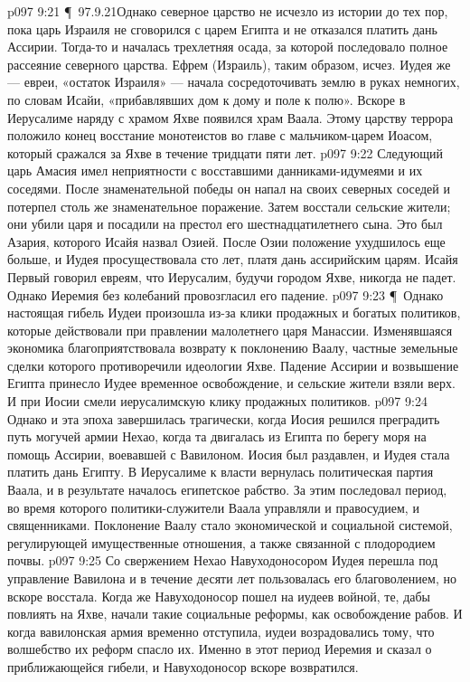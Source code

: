 \vs p097 9:21 \P\ 97.9.21Однако северное царство не исчезло из истории до тех пор, пока царь Израиля не сговорился с царем Египта и не отказался платить дань Ассирии. Тогда\hyp{}то и началась трехлетняя осада, за которой последовало полное рассеяние северного царства. Ефрем (Израиль), таким образом, исчез. Иудея же --- евреи, «остаток Израиля» --- начала сосредоточивать землю в руках немногих, по словам Исайи, «прибавлявших дом к дому и поле к полю». Вскоре в Иерусалиме наряду с храмом Яхве появился храм Ваала. Этому царству террора положило конец восстание монотеистов во главе с мальчиком\hyp{}царем Иоасом, который сражался за Яхве в течение тридцати пяти лет.
\vs p097 9:22 Следующий царь Амасия имел неприятности с восставшими данниками\hyp{}идумеями и их соседями. После знаменательной победы он напал на своих северных соседей и потерпел столь же знаменательное поражение. Затем восстали сельские жители; они убили царя и посадили на престол его шестнадцатилетнего сына. Это был Азария, которого Исайя назвал Озией. После Озии положение ухудшилось еще больше, и Иудея просуществовала сто лет, платя дань ассирийским царям. Исайя Первый говорил евреям, что Иерусалим, будучи городом Яхве, никогда не падет. Однако Иеремия без колебаний провозгласил его падение.
\vs p097 9:23 \P\ Однако настоящая гибель Иудеи произошла из\hyp{}за клики продажных и богатых политиков, которые действовали при правлении малолетнего царя Манассии. Изменявшаяся экономика благоприятствовала возврату к поклонению Ваалу, частные земельные сделки которого противоречили идеологии Яхве. Падение Ассирии и возвышение Египта принесло Иудее временное освобождение, и сельские жители взяли верх. И при Иосии смели иерусалимскую клику продажных политиков.
\vs p097 9:24 Однако и эта эпоха завершилась трагически, когда Иосия решился преградить путь могучей армии Нехао, когда та двигалась из Египта по берегу моря на помощь Ассирии, воевавшей с Вавилоном. Иосия был раздавлен, и Иудея стала платить дань Египту. В Иерусалиме к власти вернулась политическая партия Ваала, и в результате началось  египетское рабство. За этим последовал период, во время которого политики\hyp{}служители Ваала управляли и правосудием, и священниками. Поклонение Ваалу стало экономической и социальной системой, регулирующей имущественные отношения, а также связанной с плодородием почвы.
\vs p097 9:25 Со свержением Нехао Навуходоносором Иудея перешла под управление Вавилона и в течение десяти лет пользовалась его благоволением, но вскоре восстала. Когда же Навуходоносор пошел на иудеев войной, те, дабы повлиять на Яхве, начали такие социальные реформы, как освобождение рабов. И когда вавилонская армия временно отступила, иудеи возрадовались тому, что волшебство их реформ спасло их. Именно в этот период Иеремия и сказал о приближающейся гибели, и Навуходоносор вскоре возвратился.
